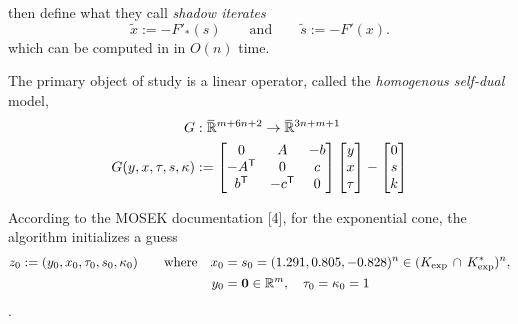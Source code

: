 \documentclass[twoside]{article}
\begin{document}
\begin{lproof}
    \textcite{badenbroek2021algorithm} then define what they call \emph{shadow iterates}
    \[
        \tilde x := -F'_*(s)
        \qquad \text{and} \qquad
        \tilde s := - F'(x).
    \]
    which can be computed in in $O(n)$ time. 
    
    The primary object of study is a
    linear operator, called the \emph{homogenous self-dual} model,
    \begin{align*}
        G
            &: \mskip1mu\overline{\mskip-1mu\mathbb R\!}\,^{m + 6n + 2} \to \mskip1mu\overline{\mskip-1mu\mathbb R\!}\,^{3n + m + 1} \\
        G(y,x,\tau,s,\kappa) 
            &:= \begin{bmatrix}
                0          &  A  &  -b \\
                -A^{\sf T} &  0  &  c \\
                b^{\sf T}  & -c^{\sf T} & 0
        \end{bmatrix}
        \begin{bmatrix}
            y \\ x \\ \tau
        \end{bmatrix}
        -
        \begin{bmatrix}
            0 \\ s \\k
        \end{bmatrix}
    \end{align*}
    
    According to the MOSEK documentation [4]\parencite{MOSEKDOC},
        for the exponential cone,
    the algorithm initializes a guess
    \begin{align*}
        z_0 := (y_0, x_0, \tau_0, s_0, \kappa_0)
            \qquad
                \text{where}\quad
                x_0 &= s_0 = (1.291, 0.805, -0.828)^n \in 
                    (K_{\exp} \,\cap\, K_{\exp}^*)^n, \\
            \qquad
                y_0 &= \mathbf{0}  \in \mathbb R^m,
            \quad
                \tau_0 = \kappa_0 = 1
    \end{align*}.
    
    \def\daff#1{\Delta {#1}^{\text{aff}}}
    \def\dcen#1{\Delta {#1}^{\text{cen}}}
    

\end{lproof}
\end{document}

